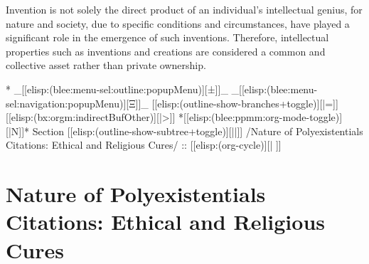 \begin{whenOrg}
\begin{verblatex}
\begin{frame}[fragile,plain,label=ayatollahMotahari]
\bigskip

    Invention is not solely the direct product of an individual's
    intellectual genius, for nature and society, due to specific
    conditions and circumstances, have played a significant role
    in the emergence of such inventions. Therefore, intellectual
    properties such as inventions and creations are considered a
    common and collective asset rather than private ownership.




\end{frame}
\end{verblatex}



\begin{whenOrg}
*  _[[elisp:(blee:menu-sel:outline:popupMenu)][±]]_ _[[elisp:(blee:menu-sel:navigation:popupMenu)][Ξ]]_ [[elisp:(outline-show-branches+toggle)][|=]] [[elisp:(bx:orgm:indirectBufOther)][|>]] *[[elisp:(blee:ppmm:org-mode-toggle)][|N]]*  Section    [[elisp:(outline-show-subtree+toggle)][||]]   /Nature of Polyexistentials Citations: Ethical and Religious Cures/ ::  [[elisp:(org-cycle)][| ]]
\end{whenOrg}

\section{Nature of Polyexistentials Citations: Ethical and Religious Cures}



\end{whenOrg}
